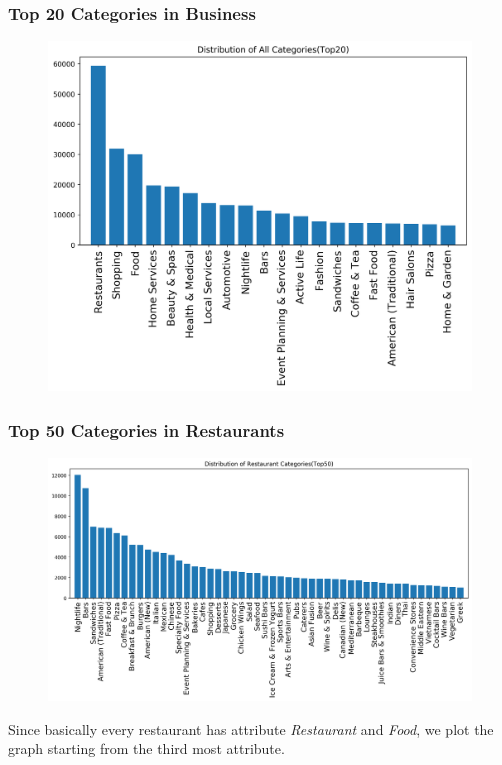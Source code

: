 \documentclass[12pt]{article}
\begin{document}
\subsubsection{Top 20 Categories in Business}
\begin{figure}[H]
\begin{center}
    \includegraphics[width=1.0\textwidth]{../05_dataMining/distributionAllCategories.png}
\end{center}
\end{figure}
\subsubsection{Top 50 Categories in Restaurants}
\begin{figure}[H]
\begin{center}
    \includegraphics[width=1.0\textwidth]{../05_dataMining/distributionRestaurants.png}
\end{center}
\end{figure}
Since basically every restaurant has attribute {\it Restaurant} and {\it Food}, we plot the graph starting from the third most attribute.
\end{document}
